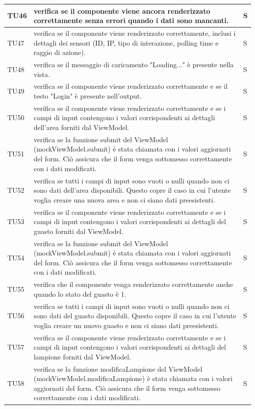 \documentclass[12pt]{article}
\begin{document}
\begin{xltabular}{\linewidth}{|>{\hsize}X|X|>{\hsize}X|}
	TU46 & verifica se il componente viene ancora renderizzato correttamente senza errori quando i dati sono mancanti. & S \\ \hline
	TU47 & verifica se il componente viene renderizzato correttamente, inclusi i dettagli dei sensori (ID, IP, tipo di interazione, polling time e raggio di azione). & S \\ \hline
	TU48 & verifica se il messaggio di caricamento "Loading..." è presente nella vista. & S \\ \hline
	TU49 & verifica se il componente viene renderizzato correttamente e se il testo "Login" è presente nell'output. & S \\ \hline
	TU50 & verifica se il componente viene renderizzato correttamente e se i campi di input contengono i valori corrispondenti ai dettagli dell'area forniti dal ViewModel. & S \\ \hline
	TU51 & verifica se la funzione submit del ViewModel (mockViewModel.submit) è stata chiamata con i valori aggiornati del form. Ciò assicura che il form venga sottomesso correttamente con i dati modificati. & S \\ \hline
	TU52 & verifica se tutti i campi di input sono vuoti o nulli quando non ci sono dati dell'area disponibili. Questo copre il caso in cui l'utente voglia creare una nuova area e non ci siano dati preesistenti. & S \\ \hline
	TU53 & verifica se il componente viene renderizzato correttamente e se i campi di input contengono i valori corrispondenti ai dettagli del guasto forniti dal ViewModel. & S \\ \hline
	TU54 & verifica se la funzione submit del ViewModel (mockViewModel.submit) è stata chiamata con i valori aggiornati del form. Ciò assicura che il form venga sottomesso correttamente con i dati modificati. & S \\ \hline
	TU55 & verifica che il componente venga renderizzato correttamente anche quando lo stato del guasto è 1. & S \\ \hline
	TU56 & verifica se tutti i campi di input sono vuoti o nulli quando non ci sono dati del guasto disponibili. Questo copre il caso in cui l'utente voglia creare un nuovo guasto e non ci siano dati preesistenti. & S \\ \hline
	TU57 & verifica se il componente viene renderizzato correttamente e se i campi di input contengono i valori corrispondenti ai dettagli del lampione forniti dal ViewModel. & S \\ \hline
	TU58 & verifica se la funzione modificaLampione del ViewModel (mockViewModel.modificaLampione) è stata chiamata con i valori aggiornati del form. Ciò assicura che il form venga sottomesso correttamente con i dati modificati. & S \\ \hline

\end{xltabular}
\end{document}
